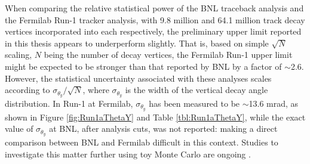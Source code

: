When comparing the relative statistical power of the BNL traceback analysis and the Fermilab Run-1 tracker analysis, with 9.8 million and 64.1 million track decay vertices incorporated into each respectively, the preliminary upper limit reported in this thesis appears to underperform slightly. That is, based on simple $\sqrt{N}$ scaling, $N$ being the number of decay vertices, the Fermilab Run-1 upper limit might be expected to be stronger than that reported by BNL by a factor of $\sim$2.6. However, the statistical uncertainty associated with these analyses scales according to $\sigma_{\theta_{y}}/\sqrt{N}$, where $\sigma_{\theta_{y}}$ is the width of the vertical decay angle distribution. In Run-1 at Fermilab, $\sigma_{\theta_{y}}$ has been measured to be $\sim$13.6 mrad, as shown in Figure \ref{fig:Run1aThetaY} and Table \ref{tbl:Run1aThetaY}, while the exact value of $\sigma_{\theta_{y}}$ at BNL, after analysis cuts, was not reported: making a direct comparison between BNL and Fermilab difficult in this context. Studies to investigate this matter further using toy Monte Carlo are ongoing \cite{PriceUpdatedEDMLimits}.








